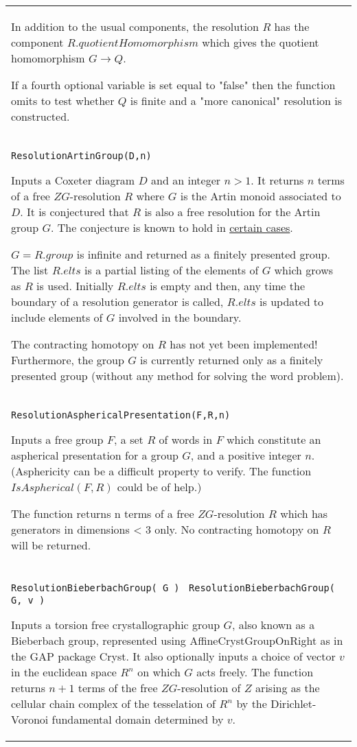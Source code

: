 \documentclass[a4paper,11pt]{report}
\begin{document}
{\begin{center}
\begin{tabular}{|l|}
 In addition to the usual components, the resolution $R$ has the component $R.quotientHomomorphism$ which gives the quotient homomorphism $G \longrightarrow Q $.

 If a fourth optional variable is set equal to "false" then the function omits
to test whether $Q$ is finite and a "more canonical" resolution is constructed. \\
 \index{ResolutionArtinGroup} \texttt{ResolutionArtinGroup(D,n)} 

 Inputs a Coxeter diagram $D$ and an integer $n>1$. It returns $n$ terms of a free $ZG$-resolution $R$ where $G$ is the Artin monoid associated to $D$. It is conjectured that $R$ is also a free resolution for the Artin group $G$. The conjecture is known to hold in \href{../www/SideLinks/About/aboutArtinGroups.html} {certain cases}.

 $G=R.group$ is infinite and returned as a finitely presented group. The list $R.elts$ is a partial listing of the elements of $G$ which grows as $R$ is used. Initially $R.elts$ is empty and then, any time the boundary of a resolution generator is called, $R.elts$ is updated to include elements of $G$ involved in the boundary.

 The contracting homotopy on $R$ has not yet been implemented! Furthermore, the group $G$ is currently returned only as a finitely presented group (without any method
for solving the word problem). \\
 \index{ResolutionAsphericalPresentation} \texttt{ResolutionAsphericalPresentation(F,R,n)} 

 Inputs a free group $F$, a set $R$ of words in $F$ which constitute an aspherical presentation for a group $G$, and a positive integer $n$. (Asphericity can be a difficult property to verify. The function $IsAspherical(F,R)$ could be of help.)

 The function returns n terms of a free $ZG$-resolution $R$ which has generators in dimensions {\textless} 3 only. No contracting homotopy
on $R$ will be returned. \\
 \index{ResolutionBieberbachGroup (HAPcryst)} \texttt{ResolutionBieberbachGroup( G ) } \texttt{ResolutionBieberbachGroup( G, v ) } 

 Inputs a torsion free crystallographic group $G$, also known as a Bieberbach group, represented using AffineCrystGroupOnRight
as in the GAP package Cryst. It also optionally inputs a choice of vector $v$ in the euclidean space $R^n$ on which $G$ acts freely. The function returns $n+1$ terms of the free $ZG$-resolution of $Z$ arising as the cellular chain complex of the tesselation of $R^n$ by the Dirichlet-Voronoi fundamental domain determined by $v$. 


\end{tabular}
\end{center}}
\end{document}
